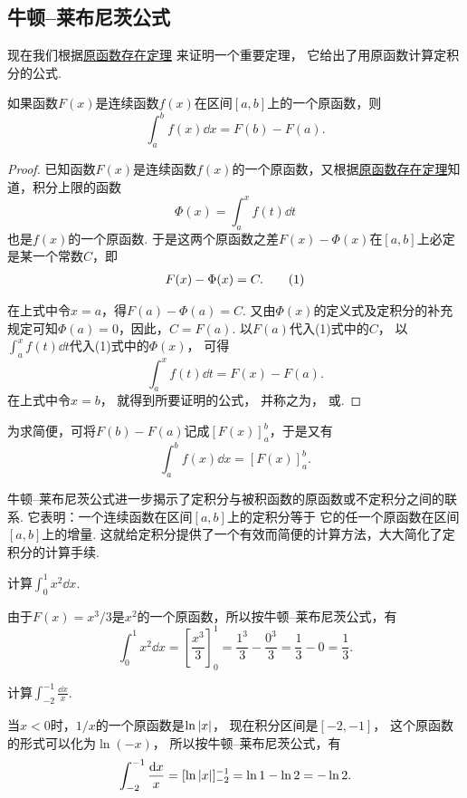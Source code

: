 \subsection{牛顿--莱布尼茨公式}
现在我们根据\hyperref[theorem:定积分.原函数存在定理]{原函数存在定理}%
来证明一个重要定理，
它给出了用原函数计算定积分的公式.
\begin{theorem}
如果函数\(F(x)\)是连续函数\(f(x)\)在区间\([a,b]\)上的一个原函数，则
\begin{equation}\label{equation:定积分.牛顿--莱布尼茨公式}
\int_a^b f(x) \dd{x} = F(b) - F(a).
\end{equation}
\begin{proof}
已知函数\(F(x)\)是连续函数\(f(x)\)的一个原函数，又根据\hyperref[theorem:定积分.原函数存在定理]{原函数存在定理}知道，积分上限的函数\[
\Phi(x) = \int_a^x f(t) \dd{t}
\]也是\(f(x)\)的一个原函数.
于是这两个原函数之差\(F(x) - \Phi(x)\)在\([a,b]\)上必定是某一个常数\(C\)，即\begin{gather}
F(x) - \Phi(x) = C. \tag1
\end{gather}

在上式中令\(x=a\)，得\(F(a) - \Phi(a) = C\).
又由\(\Phi(x)\)的定义式及定积分的补充规定可知\(\Phi(a) = 0\)，因此，\(C = F(a)\).
以\(F(a)\)代入(1)式中的\(C\)，
以\(\int_a^x f(t) \dd{t}\)代入(1)式中的\(\Phi(x)\)，
可得\[
	\int_a^x f(t) \dd{t} = F(x) - F(a).
\]
在上式中令\(x=b\)，
就得到所要证明的公式，
并称之为，
或.
\end{proof}
\end{theorem}
为求简便，可将\(F(b) - F(a)\)记成\([F(x)]_a^b\)，于是又有\[
\int_a^b f(x) \dd{x} = [F(x)]_a^b.
\]

牛顿--莱布尼茨公式进一步揭示了定积分与被积函数的原函数或不定积分之间的联系.
它表明：一个连续函数在区间\([a,b]\)上的定积分等于
它的任一个原函数在区间\([a,b]\)上的增量.
这就给定积分提供了一个有效而简便的计算方法，大大简化了定积分的计算手续.

\begin{example}
计算\(\int_0^1 x^2 \dd{x}\).
\begin{solution}
由于\(F(x) = x^3/3\)是\(x^2\)的一个原函数，所以按牛顿--莱布尼茨公式，有\[
\int_0^1 x^2 \dd{x} = \left[\frac{x^3}{3}\right]_0^1
= \frac{1^3}{3} - \frac{0^3}{3} = \frac{1}{3} - 0 = \frac{1}{3}.
\]
\end{solution}
\end{example}

\begin{example}
计算\(\int_{-2}^{-1} \frac{\dd{x}}{x}\).
\begin{solution}
当\(x<0\)时，\(1/x\)的一个原函数是\(\ln\abs{x}\)，
现在积分区间是\([-2,-1]\)，
这个原函数的形式可以化为\(\ln(-x)\)，
所以按牛顿--莱布尼茨公式，有\[
\int_{-2}^{-1} \frac{\dd{x}}{x}
= [ \ln\abs{x} ]_{-2}^{-1}
= \ln1 - \ln2
= -\ln2.
\]
\end{solution}
\end{example}

